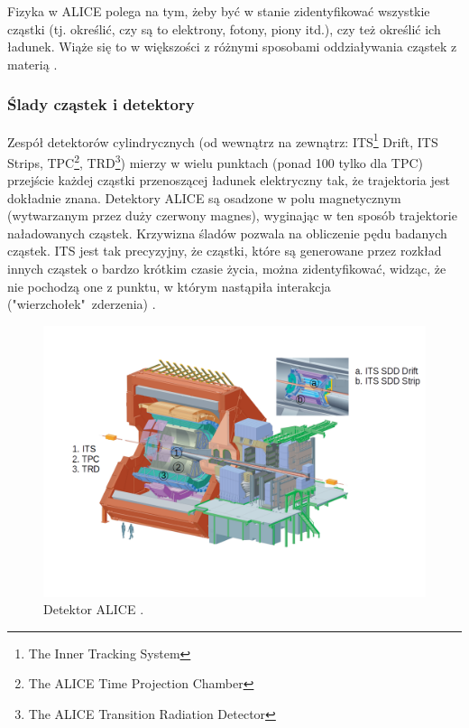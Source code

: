 Fizyka w ALICE polega na tym, żeby być w stanie zidentyfikować wszystkie cząstki (tj. określić, czy są to elektrony, fotony, piony itd.), czy też określić ich ładunek. Wiąże się to w większości z różnymi sposobami oddziaływania cząstek z materią \cite{aliceexperiment}.


\subsubsection{Ślady cząstek i detektory}

Zespół detektorów cylindrycznych (od wewnątrz na zewnątrz: ITS\footnote{The Inner Tracking System} Drift, ITS Strips, TPC\footnote{The ALICE Time Projection Chamber}, TRD\footnote{The ALICE Transition Radiation Detector}) mierzy w wielu punktach (ponad 100 tylko dla TPC) przejście każdej cząstki przenoszącej ładunek elektryczny tak, że trajektoria jest dokładnie znana. Detektory ALICE są osadzone w polu magnetycznym (wytwarzanym przez duży czerwony magnes), wyginając w ten sposób trajektorie naładowanych cząstek. Krzywizna śladów pozwala na obliczenie pędu badanych cząstek. ITS jest tak precyzyjny, że cząstki, które są generowane przez rozkład innych cząstek o bardzo krótkim czasie życia, można zidentyfikować, widząc, że nie pochodzą one z punktu, w którym nastąpiła interakcja ("wierzchołek"\ zderzenia) \cite{trackingparticles}.

\begin{figure}[H]
		\centering
 		\includegraphics[width=16.0cm]{detector.png}
    	\caption{Detektor ALICE \cite{aliceofficial}.}
 		\label{rys9}
\end{figure}
